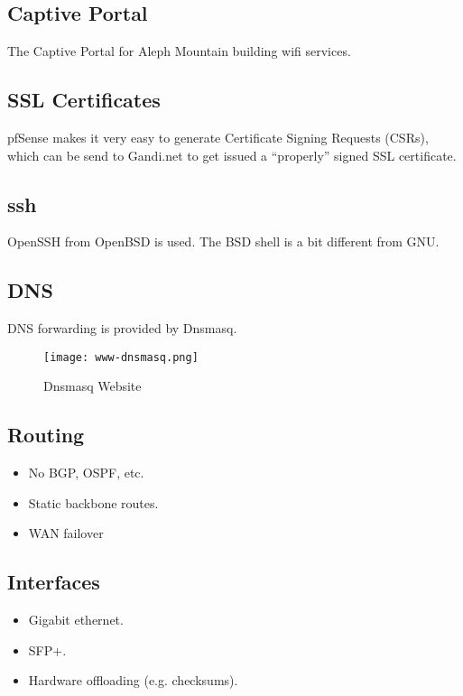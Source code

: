 \subsection{Captive Portal}
The Captive Portal for Aleph Mountain building wifi services.


\subsection{SSL Certificates}
pfSense makes it very easy to generate Certificate Signing Requests (CSRs),
which can be send to Gandi.net to get issued a ``properly'' signed SSL
certificate.


\subsection{ssh}
OpenSSH from OpenBSD is used. The BSD shell is a bit different from GNU.


\subsection{DNS}
DNS forwarding is provided by Dnsmasq.

\begin{figure}[h!]
\texttt{[image: www-dnsmasq.png]}
 \caption{Dnsmasq Website}
 \label{fig:www-dnsmasq}
\end{figure}



\subsection{Routing}
\begin{itemize}
 \item No BGP, OSPF, etc.
 \item Static backbone routes.
 \item WAN failover
\end{itemize}


\subsection{Interfaces}

\begin{itemize}
 \item Gigabit ethernet.
 \item SFP+.
 \item Hardware offloading (e.g. checksums).
\end{itemize}


